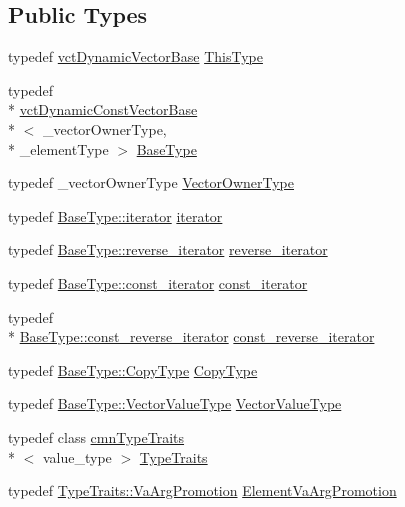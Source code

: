 \subsection*{Public Types}
\begin{DoxyCompactItemize}
\item 
typedef \hyperlink{classvct_dynamic_vector_base}{vct\-Dynamic\-Vector\-Base} \hyperlink{classvct_dynamic_vector_base_ae4c00cc291df57593d6a73c838ae897a}{This\-Type}
\item 
typedef \\*
\hyperlink{classvct_dynamic_const_vector_base}{vct\-Dynamic\-Const\-Vector\-Base}\\*
$<$ \-\_\-vector\-Owner\-Type, \\*
\-\_\-element\-Type $>$ \hyperlink{classvct_dynamic_vector_base_a773a8005371ea8d078a842eff2cb719f}{Base\-Type}
\item 
typedef \-\_\-vector\-Owner\-Type \hyperlink{classvct_dynamic_vector_base_a563d79f5b4dd71f037192fe2961b48eb}{Vector\-Owner\-Type}
\item 
typedef \hyperlink{classvct_dynamic_const_vector_base_aaed13bc31a9ee4971bad765ba5c2c811}{Base\-Type\-::iterator} \hyperlink{classvct_dynamic_vector_base_a5f711892fff6a5b01aa014db476f3084}{iterator}
\item 
typedef \hyperlink{classvct_dynamic_const_vector_base_af10d167259519ceeca9276da3435e193}{Base\-Type\-::reverse\-\_\-iterator} \hyperlink{classvct_dynamic_vector_base_ad569da2c70b9f9468f466f59535d53c7}{reverse\-\_\-iterator}
\item 
typedef \hyperlink{classvct_dynamic_const_vector_base_ad04d1e54698ac5e244d15dfacd0e603c}{Base\-Type\-::const\-\_\-iterator} \hyperlink{classvct_dynamic_vector_base_adf3a8f5fcdecc355b9930fa2166e3fb6}{const\-\_\-iterator}
\item 
typedef \\*
\hyperlink{classvct_dynamic_const_vector_base_aadfcc99550b376238b6c793c17d19ca5}{Base\-Type\-::const\-\_\-reverse\-\_\-iterator} \hyperlink{classvct_dynamic_vector_base_a19db937e3f8b2fdc7c7d6e720c2bc9b3}{const\-\_\-reverse\-\_\-iterator}
\item 
typedef \hyperlink{classvct_dynamic_const_vector_base_a010ba1a93ccebf494be5a188f923eb43}{Base\-Type\-::\-Copy\-Type} \hyperlink{classvct_dynamic_vector_base_a62fcc6341849207c5273566d0bce3cf5}{Copy\-Type}
\item 
typedef \hyperlink{classvct_dynamic_const_vector_base_a8ffd0619835fb50d43c07502d231e6c8}{Base\-Type\-::\-Vector\-Value\-Type} \hyperlink{classvct_dynamic_vector_base_ad3db797a792ca2ced6433a42b0fa54d6}{Vector\-Value\-Type}
\item 
typedef class \hyperlink{classcmn_type_traits}{cmn\-Type\-Traits}\\*
$<$ value\-\_\-type $>$ \hyperlink{classvct_dynamic_vector_base_ae5ebb885e67454fa18cb8101f1acc8dd}{Type\-Traits}
\item 
typedef \hyperlink{classcmn_type_traits_a824cf785b2d249f59bf5d9f03c6e8049}{Type\-Traits\-::\-Va\-Arg\-Promotion} \hyperlink{classvct_dynamic_vector_base_a74f36531adfd7ec68ac6500176134156}{Element\-Va\-Arg\-Promotion}
\end{DoxyCompactItemize}
